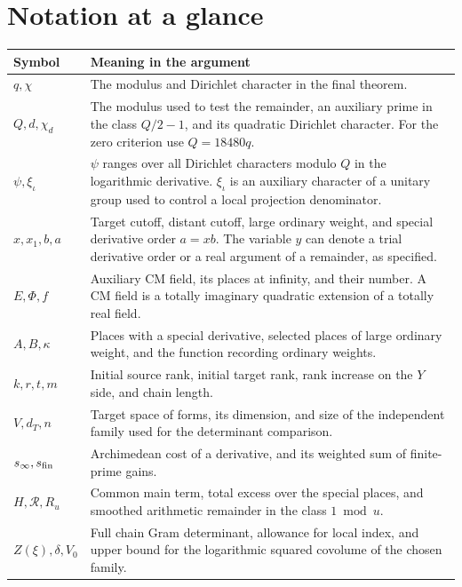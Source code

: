 \documentclass[11pt,letterpaper]{article}
\begin{document}
\clearpage
\section*{Notation at a glance}\label{sec:glossary}
\begin{tabularx}{\linewidth}{@{}p{.19\linewidth}X@{}}
\toprule
\textbf{Symbol} & \textbf{Meaning in the argument}\\\midrule
\(q,\chi\)&The modulus and Dirichlet character in the final theorem.\\[3pt]
\(Q,d,\chi_d\)&The modulus used to test the remainder, an auxiliary prime in the class \(Q/2-1\), and its quadratic Dirichlet character. For the zero criterion use \(Q=18480q\).\\[3pt]
\(\psi,\xi_\iota\)&\(\psi\) ranges over all Dirichlet characters modulo \(Q\) in the logarithmic derivative. \(\xi_\iota\) is an auxiliary character of a unitary group used to control a local projection denominator.\\[3pt]
\(x,x_1,b,a\)&Target cutoff, distant cutoff, large ordinary weight, and special derivative order \(a=xb\). The variable \(y\) can denote a trial derivative order or a real argument of a remainder, as specified.\\[3pt]
\(E,\Phi,f\)&Auxiliary CM field, its places at infinity, and their number. A CM field is a totally imaginary quadratic extension of a totally real field.\\[3pt]
\(A,B,\kappa\)&Places with a special derivative, selected places of large ordinary weight, and the function recording ordinary weights.\\[3pt]
\(k,r,t,m\)&Initial source rank, initial target rank, rank increase on the \(Y\) side, and chain length.\\[3pt]
\(V,d_T,n\)&Target space of forms, its dimension, and size of the independent family used for the determinant comparison.\\[3pt]
\(s_\infty,s_{\rm fin}\)&Archimedean cost of a derivative, and its weighted sum of finite-prime gains.\\[3pt]
\(H,\mathcal R,R_u\)&Common main term, total excess over the special places, and smoothed arithmetic remainder in the class \(1\bmod u\).\\[3pt]
\(Z(\xi),\delta,V_0\)&Full chain Gram determinant, allowance for local index, and upper bound for the logarithmic squared covolume of the chosen family.\\\bottomrule
\end{tabularx}
\vspace{6pt}
\end{document}
